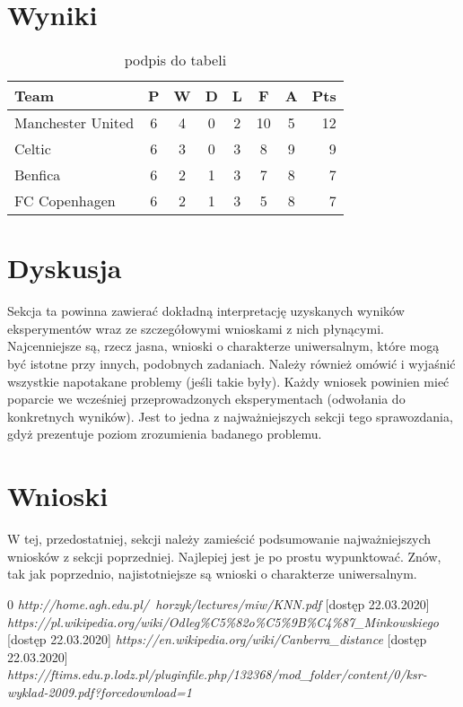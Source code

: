 \documentclass{classrep}
\begin{document}
\section{Wyniki} %
\begin{table}[t]
\caption{podpis do tabeli}
\begin{center}
\begin{tabular}{l*{6}{c}r}
Team              & P & W & D & L & F  & A & Pts \\
\hline
Manchester United & 6 & 4 & 0 & 2 & 10 & 5 & 12  \\
Celtic            & 6 & 3 & 0 & 3 &  8 & 9 &  9  \\
Benfica           & 6 & 2 & 1 & 3 &  7 & 8 &  7  \\
FC Copenhagen     & 6 & 2 & 1 & 3 &  5 & 8 &  7  \\
\end{tabular}
\end{center}
\label{nazwa odnośnika, która potem użyjemy do cytowania tabeli}
\end{table}

\section{Dyskusja} %
{\color{blue}
Sekcja ta powinna zawierać dokładną interpretację uzyskanych wyników
eksperymentów wraz ze szczegółowymi wnioskami z nich płynącymi. Najcenniejsze
są, rzecz jasna, wnioski o charakterze uniwersalnym, które mogą być istotne
przy innych, podobnych zadaniach. Należy również omówić i wyjaśnić wszystkie
napotakane problemy (jeśli takie były). Każdy wniosek powinien mieć poparcie
we wcześniej przeprowadzonych eksperymentach (odwołania do konkretnych
wyników). Jest to jedna z najważniejszych sekcji tego sprawozdania, gdyż
prezentuje poziom zrozumienia badanego problemu.}
\section{Wnioski}
{\color{blue}W tej, przedostatniej, sekcji należy zamieścić podsumowanie
najważniejszych wniosków z sekcji poprzedniej. Najlepiej jest je po prostu
wypunktować. Znów, tak jak poprzednio, najistotniejsze są wnioski o
charakterze uniwersalnym.}


\begin{thebibliography} {0}
 \textsl{http://home.agh.edu.pl/~horzyk/lectures/miw/KNN.pdf} [dostęp 22.03.2020]
 \textsl{https://pl.wikipedia.org/wiki/Odleg\%C5\%82o\%C5\%9B\%C4\%87\_Minkowskiego} [dostęp 22.03.2020]
 \textsl{https://en.wikipedia.org/wiki/Canberra\_distance} [dostęp 22.03.2020]
 \textsl{https://ftims.edu.p.lodz.pl/pluginfile.php/132368/mod\_folder/content/0/ksr-wyklad-2009.pdf?forcedownload=1}
\end{thebibliography}
\end{document}
